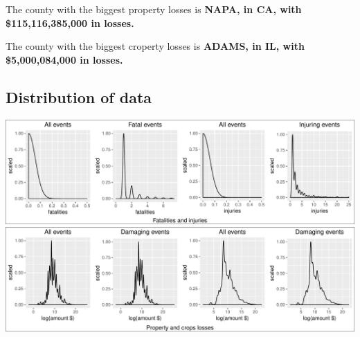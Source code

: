 \documentclass[]{article}
\begin{document}
The county with the biggest property losses is \textbf{NAPA, in CA, with
\$115,116,385,000 in losses.}

The county with the biggest croperty losses is \textbf{ADAMS, in IL,
with \$5,000,084,000 in losses.}

\subsection{Distribution of data}\label{distribution-of-data}

\includegraphics{readme_files/figure-latex/distribution-1.pdf}
\includegraphics{readme_files/figure-latex/distribution-2.pdf}
\end{document}
